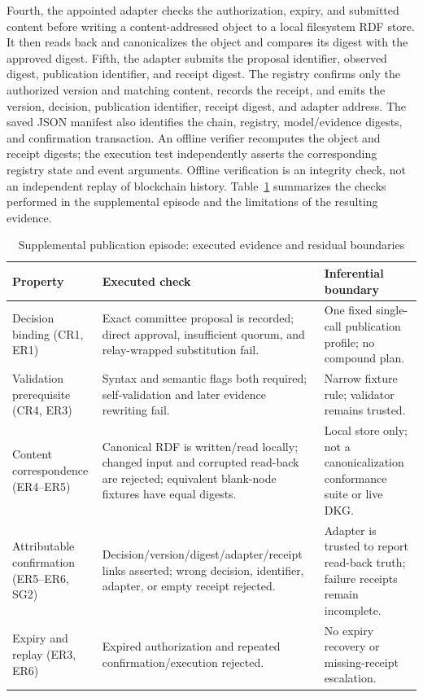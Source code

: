 \documentclass[journal]{IEEEtran}
\begin{document}
Fourth, the appointed adapter checks the authorization, expiry, and submitted
content before writing a content-addressed object to a local filesystem RDF
store. It then reads back and canonicalizes the object and compares its digest
with the approved digest. Fifth, the adapter submits the proposal identifier,
observed digest, publication identifier, and receipt digest. The registry
confirms only the authorized version and matching content, records the receipt,
and emits the version, decision, publication identifier, receipt digest, and
adapter address. The saved JSON manifest also identifies the chain, registry,
model/evidence digests, and confirmation transaction. An offline verifier
recomputes the object and receipt digests; the execution test independently
asserts the corresponding registry state and event arguments. Offline
verification is an integrity check, not an independent replay of blockchain
history. Table~\ref{tab:publication_episode} summarizes the checks
performed in the supplemental episode and the limitations
of the resulting evidence.

\begin{table}[t]
\centering\footnotesize
\caption{Supplemental publication episode: executed evidence and residual boundaries}
\label{tab:publication_episode}
\begin{tabular}{@{}p{4.0cm}p{7.0cm}p{6.0cm}@{}}
\toprule
\textbf{Property} & \textbf{Executed check} & \textbf{Inferential boundary} \\
\midrule
Decision binding (CR1, ER1) & Exact committee proposal is recorded; direct approval, insufficient quorum, and relay-wrapped substitution fail. & One fixed single-call publication profile; no compound plan. \\
Validation prerequisite (CR4, ER3) & Syntax and semantic flags both required; self-validation and later evidence rewriting fail. & Narrow fixture rule; validator remains trusted. \\
Content correspondence (ER4--ER5) & Canonical RDF is written/read locally; changed input and corrupted read-back are rejected; equivalent blank-node fixtures have equal digests. & Local store only; not a canonicalization conformance suite or live DKG. \\
Attributable confirmation (ER5--ER6, SG2) & Decision/version/digest/adapter/receipt links asserted; wrong decision, identifier, adapter, or empty receipt rejected. & Adapter is trusted to report read-back truth; failure receipts remain incomplete. \\
Expiry and replay (ER3, ER6) & Expired authorization and repeated confirmation/execution rejected. & No expiry recovery or missing-receipt escalation. \\
\bottomrule
\end{tabular}
\end{table}
\end{document}
